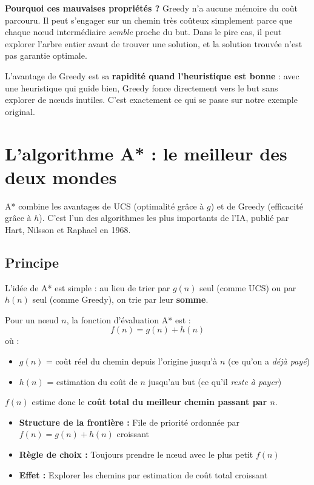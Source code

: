 \documentclass[11pt,a4paper]{article}
\begin{document}
\textbf{Pourquoi ces mauvaises propriétés ?} Greedy n'a aucune mémoire du coût parcouru. Il peut s'engager sur un chemin très coûteux simplement parce que chaque nœud intermédiaire \textit{semble} proche du but. Dans le pire cas, il peut explorer l'arbre entier avant de trouver une solution, et la solution trouvée n'est pas garantie optimale.

L'avantage de Greedy est sa \textbf{rapidité quand l'heuristique est bonne} : avec une heuristique qui guide bien, Greedy fonce directement vers le but sans explorer de nœuds inutiles. C'est exactement ce qui se passe sur notre exemple original.

\section{L'algorithme A* : le meilleur des deux mondes}

A* combine les avantages de UCS (optimalité grâce à $g$) et de Greedy (efficacité grâce à $h$). C'est l'un des algorithmes les plus importants de l'IA, publié par Hart, Nilsson et Raphael en 1968.

\subsection{Principe}

L'idée de A* est simple : au lieu de trier par $g(n)$ seul (comme UCS) ou par $h(n)$ seul (comme Greedy), on trie par leur \textbf{somme}.

\begin{definitionbox}
Pour un nœud $n$, la fonction d'évaluation A* est :
$$f(n) = g(n) + h(n)$$
où :
\begin{itemize}
    \item $g(n)$ = coût réel du chemin depuis l'origine jusqu'à $n$ (ce qu'on a \textit{déjà payé})
    \item $h(n)$ = estimation du coût de $n$ jusqu'au but (ce qu'il \textit{reste à payer})
\end{itemize}
$f(n)$ estime donc le \textbf{coût total du meilleur chemin passant par $n$}.
\end{definitionbox}

\begin{recipebox}[Recette -- A*]
\begin{itemize}
    \item \textbf{Structure de la frontière :} File de priorité ordonnée par $f(n) = g(n) + h(n)$ croissant
    \item \textbf{Règle de choix :} Toujours prendre le nœud avec le plus petit $f(n)$
    \item \textbf{Effet :} Explorer les chemins par estimation de coût total croissant
\end{itemize}
\end{recipebox}
\end{document}

